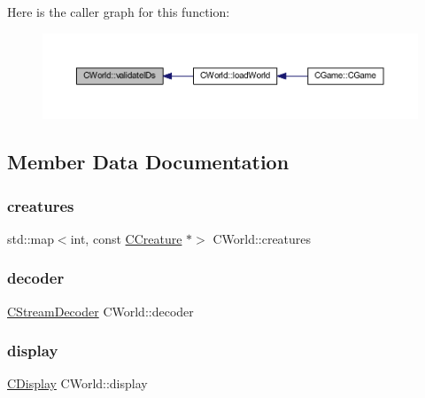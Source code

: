 Here is the caller graph for this function\+:\nopagebreak
\begin{figure}[H]
\begin{center}
\leavevmode
\includegraphics[width=350pt]{class_c_world_a5220755d94cacc872e0f5ae0e7e55eb6_icgraph}
\end{center}
\end{figure}


\subsection{Member Data Documentation}
\mbox{\label{class_c_world_a58749fe58efd9258a7979566de208358}} 
\subsubsection{\texorpdfstring{creatures}{creatures}}
{\footnotesize\ttfamily std\+::map$<$int, const \mbox{\hyperlink{class_c_creature}{C\+Creature}} $\ast$$>$ C\+World\+::creatures\hspace{0.3cm}{\ttfamily [protected]}}

\mbox{\label{class_c_world_affc2da4807829a42a991fa7f8cba7c27}} 
\subsubsection{\texorpdfstring{decoder}{decoder}}
{\footnotesize\ttfamily \mbox{\hyperlink{class_c_stream_decoder}{C\+Stream\+Decoder}} C\+World\+::decoder\hspace{0.3cm}{\ttfamily [protected]}}

\mbox{\label{class_c_world_a79fe0ec8494e4e1d42fc82e36904d517}} 
\subsubsection{\texorpdfstring{display}{display}}
{\footnotesize\ttfamily \mbox{\hyperlink{class_c_display}{C\+Display}} C\+World\+::display\hspace{0.3cm}{\ttfamily [protected]}}

